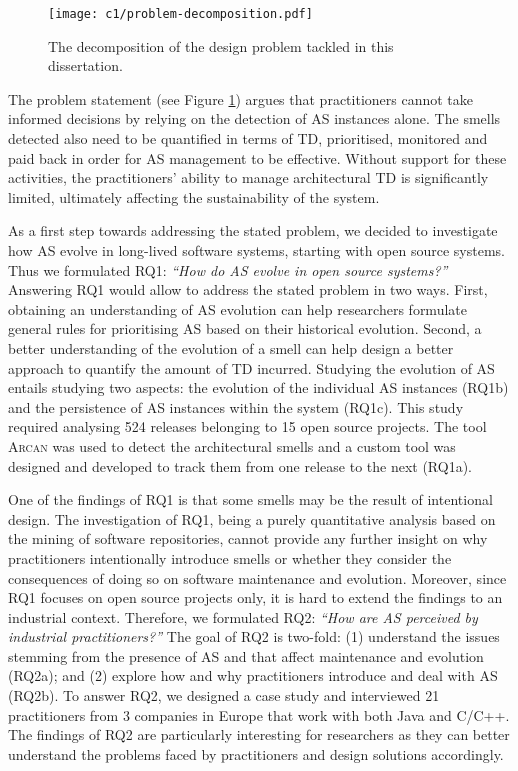 \begin{figure}
    \centering
    \texttt{[image: c1/problem-decomposition.pdf]}
    \caption{The decomposition of the design problem tackled in this dissertation.}\label{fig:intro:problem-decomposition}
\end{figure}

The problem statement (see Figure \ref{fig:intro:problem-decomposition}) argues that practitioners cannot take informed decisions by relying on the detection of AS instances alone.
The smells detected also need to be quantified in terms of TD, prioritised, monitored and paid back in order for AS management to be effective.
Without support for these activities, the practitioners' ability to manage architectural TD is significantly limited, ultimately affecting the sustainability of the system.

As a first step towards addressing the stated problem, we decided to investigate how AS evolve in long-lived software systems, starting with open source systems. Thus we formulated RQ1: \textit{``How do AS evolve in open source systems?''} 
Answering RQ1 would allow to address the stated problem in two ways. First, obtaining an understanding of AS evolution can help researchers formulate general rules for prioritising AS based on their historical evolution.
Second, a better understanding of the evolution of a smell can help design a better approach to quantify the amount of TD incurred.
Studying the evolution of AS entails studying two aspects: the evolution of the individual AS instances (RQ1b) and the persistence of AS instances within the system (RQ1c). This study required analysing 524 releases belonging to 15 open source projects.
The tool \textsc{Arcan} was used to detect the architectural smells and a custom tool was designed and developed to track them from one release to the next (RQ1a).

One of the findings of RQ1 is that some smells may be the result of intentional design.
The investigation of RQ1, being a purely quantitative analysis based on the mining of software repositories, cannot provide any further insight on why practitioners intentionally introduce smells or whether they consider the consequences of doing so on software maintenance and evolution.
Moreover, since RQ1 focuses on open source projects only, it is hard to extend the findings to an industrial context.
Therefore, we formulated RQ2: \textit{``How are AS perceived by industrial practitioners?''}
The goal of RQ2 is two-fold: (1) understand the issues stemming from the presence of AS and that affect maintenance and evolution (RQ2a); and (2) explore how and why practitioners introduce and deal with AS (RQ2b). 
To answer RQ2, we designed a case study and interviewed 21 practitioners from 3 companies in Europe that work with both Java and C/C++.
The findings of RQ2 are particularly interesting for researchers as they can better understand the problems faced by practitioners and design solutions accordingly.

